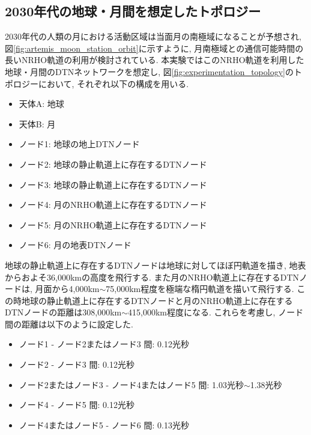 \subsection{2030年代の地球・月間を想定したトポロジー}
\label{section:2030年代の地球・月間を想定したトポロジー}
2030年代の人類の月における活動区域は当面月の南極域になることが予想され, 
図\ref{fig:artemis_moon_station_orbit}に示すように, 
月南極域との通信可能時間の長いNRHO軌道の利用が検討されている. 
本実験ではこのNRHO軌道を利用した地球・月間のDTNネットワークを想定し, 
図\ref{fig:experimentation_topology}のトポロジーにおいて, 
それぞれ以下の構成を用いる. 
\begin{itemize}
    \item 天体A: 地球
    \item 天体B: 月
    \item ノード1: 地球の地上DTNノード
    \item ノード2: 地球の静止軌道上に存在するDTNノード
    \item ノード3: 地球の静止軌道上に存在するDTNノード
    \item ノード4: 月のNRHO軌道上に存在するDTNノード
    \item ノード5: 月のNRHO軌道上に存在するDTNノード
    \item ノード6: 月の地表DTNノード
\end{itemize}
地球の静止軌道上に存在するDTNノードは地球に対してほぼ円軌道を描き, 地表からおよそ36,000kmの高度を飛行する. 
また月のNRHO軌道上に存在するDTNノードは,  月面から4,000km$\sim$75,000km程度を極端な楕円軌道を描いて飛行する. 
この時地球の静止軌道上に存在するDTNノードと月のNRHO軌道上に存在するDTNノードの距離は308,000km$\sim$415,000km程度になる. 
これらを考慮し, ノード間の距離は以下のように設定した. 
\begin{itemize}
    \item ノード1 - ノード2またはノード3 間: 0.12光秒
    \item ノード2 - ノード3 間: 0.12光秒
    \item ノード2またはノード3 - ノード4またはノード5  間: 1.03光秒$\sim$1.38光秒
    \item ノード4 - ノード5  間: 0.12光秒
    \item ノード4またはノード5 - ノード6  間: 0.13光秒
\end{itemize}

